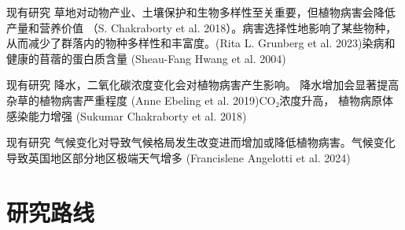 \documentclass{ldr-simple-gray}
\begin{document}
\begin{frame}{现有研究}
    草地对动物产业、土壤保护和生物多样性至关重要，但植物病害会降低产量和营养价值
（S. Chakraborty et al. 2018）。病害选择性地影响了某些物种，
从而减少了群落内的物种多样性和丰富度。(Rita L. Grunberg et al. 2023)染病和健康的苜蓿的蛋白质含量
(Sheau-Fang Hwang et al. 2004)


\end{frame}

\begin{frame}{现有研究}
    降水，二氧化碳浓度变化会对植物病害产生影响。
    降水增加会显著提高杂草的植物病害严重程度
    (Anne Ebeling et al. 2019)CO₂浓度升高，
    植物病原体感染能力增强
    (Sukumar Chakraborty et al. 2018)
    
    

\end{frame}


\begin{frame}{现有研究}
气候变化对导致气候格局发生改变进而增加或降低植物病害。气候变化导致英国地区部分地区极端天气增多
(Francislene Angelotti et al. 2024)

\end{frame}


\section{研究路线}
\end{document}
